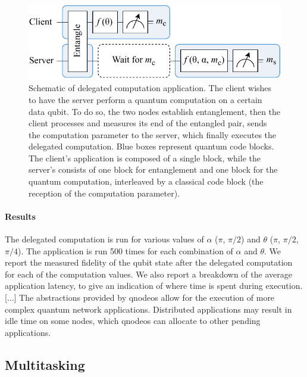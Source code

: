 \begin{figure}[t]
    \centering
    \includegraphics[width=0.6\linewidth]{figures/del-comp.pdf}
    \caption{
        Schematic of delegated computation application. The client wishes to have the server perform
        a quantum computation on a certain data qubit. To do so, the two nodes establish
        entanglement, then the client processes and measures its end of the entangled pair, sends
        the computation parameter to the server, which finally executes the delegated computation.
        Blue boxes represent quantum code blocks. The client's application is composed of a single
        block, while the server's consists of one block for entanglement and one block for the
        quantum computation, interleaved by a classical code block (the reception of the computation
        parameter).
    }
    \label{fig:del-comp}
\end{figure}

\paragraph{Results}

The delegated computation is run for various values of $\alpha$ ($\pi$, $\pi/2$) and $\theta$
($\pi$, $\pi/2$, $\pi/4$). The application is run \num{500} times for each combination of $\alpha$
and $\theta$. We report the measured fidelity of the qubit state after the delegated computation for
each of the computation values. We also report a breakdown of the average application latency, to
give an indication of where time is spent during execution. [...] The abstractions provided by
\acrshort{qnodeos} allow for the execution of more complex quantum network applications. Distributed
applications may result in idle time on some nodes, which \acrshort{qnodeos} can allocate to other
pending applications.

\subsection{Multitasking}

